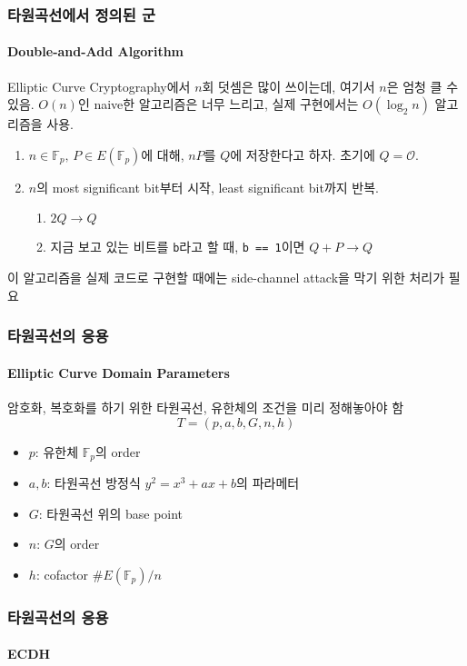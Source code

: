 \documentclass[aspectratio=169,mathserif]{beamer}
\newcommand{\Fp}{\mathbb{F}_p}
\begin{document}
  \begin{frame}
    \frametitle{타원곡선에서 정의된 군}
    \framesubtitle{Double-and-Add Algorithm}

    Elliptic Curve Cryptography에서 \(n\)회 덧셈은 많이 쓰이는데, 여기서 \(n\)은 엄청 클 수 있음.\newline
    \pause
    \(O(n)\)인 naive한 알고리즘은 너무 느리고, 실제 구현에서는 \(O(\log_2 n)\) 알고리즘을 사용.
    \begin{enumerate}
      \item \(n\in\Fp,\,P\in E(\Fp)\)에 대해, \(nP\)를 \(Q\)에 저장한다고 하자. 초기에 \(Q = \mathcal{O}\).
      \item \(n\)의 most significant bit부터 시작, least significant bit까지 반복.
      \pause
      \begin{enumerate}
        \item \(2Q\to Q\)
        \item 지금 보고 있는 비트를 \texttt{b}라고 할 때, \texttt{b == 1}이면 \(Q + P\to Q\)
      \end{enumerate}
    \end{enumerate}
    \pause
    이 알고리즘을 실제 코드로 구현할 때에는 side-channel attack을 막기 위한 처리가 필요
  \end{frame}

  \begin{frame}
    \frametitle{타원곡선의 응용}
    \framesubtitle{Elliptic Curve Domain Parameters}

    암호화, 복호화를 하기 위한 타원곡선, 유한체의 조건을 미리 정해놓아야 함
    \[T=(p,a,b,G,n,h)\]
    \begin{itemize}
      \item \(p\): 유한체 \(\Fp\)의 order
      \item \(a, b\): 타원곡선 방정식 \(y^2 = x^3 + ax + b\)의 파라메터
      \item \(G\): 타원곡선 위의 base point
      \item \(n\): \(G\)의 order
      \item \(h\): cofactor \(\#E(\Fp)/n\)
    \end{itemize}
  \end{frame}

  \begin{frame}
    \frametitle{타원곡선의 응용}
    \framesubtitle{ECDH}

    \begin{figure}
      \centering
    \scalebox{0.4}{}
    \end{figure}
  \end{frame}
\end{document}
